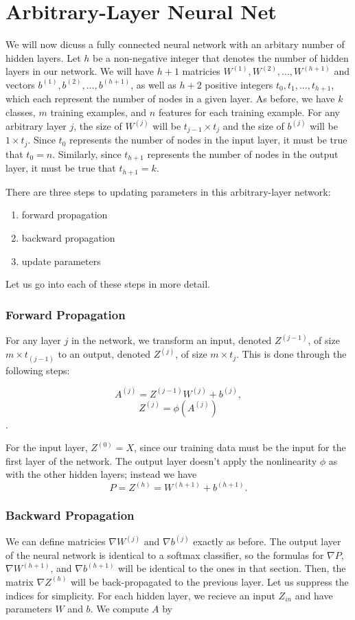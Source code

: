 \newpage
\section{Arbitrary-Layer Neural Net}
We will now dicuss a fully connected neural network with an arbitary number of
hidden layers. Let $h$ be a non-negative integer that denotes the number of
hidden layers in our network. We will have $h+1$ matricies $W^{(1)}, W^{(2)},
..., W^{(h+1)}$ and vectors $b^{(1)}, b^{(2)}, ..., b^{(h+1)}$, as well as
$h+2$ positive integers $t_0, t_1, ..., t_{h+1}$, which each represent the number
of nodes in a given layer. As before, we have $k$ classes, $m$ training
examples, and $n$ features for each training example. For any arbitrary layer
$j$, the size of $W^{(j)}$ will be $t_{j-1} \times t_j$ and the size of
$b^{(j)}$ will be $1 \times t_j$. Since $t_0$ represents the number of nodes in
the input layer, it must be true that $t_0 = n$. Similarly, since $t_{h+1}$
represents the number of nodes in the output layer, it must be true that
$t_{h+1} = k$.

There are three steps to updating parameters in this arbitrary-layer network:
\begin{enumerate}
\item forward propagation
\item backward propagation
\item update parameters
\end{enumerate}

Let us go into each of these steps in more detail.

\subsubsection{Forward Propagation}
For any layer $j$ in the network, we transform an input, denoted $Z^{(j-1)}$,
of size $m \times t_{(j-1)}$ to an output, denoted $Z^{(j)}$, of size $m \times
t_j$. This is done through the following steps:

$$ A^{(j)} = Z^{(j-1)} W^{(j)} + b^{(j)}, $$
$$ Z^{(j)} = \phi ( A^{(j)} )$$.

For the input layer, $Z^{(0)} = X$, since our training data must be the input
for the first layer of the network. The output layer doesn't apply the
nonlinearity $\phi$ as with the other hidden layers; instead we have
$$ P = Z^{(h)} = W^{(h+1)} + b^{(h+1)}. $$


\subsubsection{Backward Propagation}
We can define matricies $\nabla W^{(j)}$ and $\nabla b^{(j)}$ exactly as
before. The output layer of the neural network is identical to a softmax
classifier, so the formulas for $\nabla P$, $\nabla W^{(h+1)}$, and $\nabla
b^{(h+1)}$ will be identical to the ones in that section. Then, the matrix
$\nabla Z^{(h)}$ will be back-propagated to the previous layer. Let us suppress
the indices for simplicity. For each hidden layer, we recieve an input $Z_{in}$
and have parameters $W$ and $b$. We compute $A$ by

